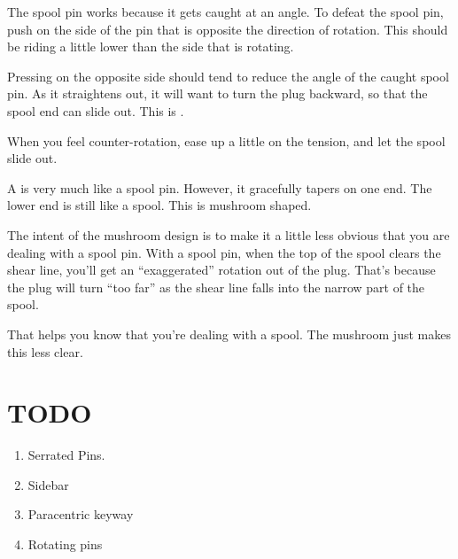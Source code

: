 \documentclass[11pt, oneside]{amsart}
\begin{document}
\begin{proposition}
  The spool pin works because it gets caught at an angle. To defeat the
  spool pin, push on the side of the pin that is opposite the direction
  of rotation. This should be riding a little lower than the side that
  is rotating.

  Pressing on the opposite side should tend to reduce the angle of the
  caught spool pin. As it straightens out, it will want to turn the plug
  backward, so that the spool end can slide out. This is
  .
\end{proposition}

\begin{proposition}
  When you feel counter-rotation, ease up a little on the tension, and
  let the spool slide out.
\end{proposition}

\begin{definition}
  A  is very much like a spool pin. However, it
  gracefully tapers on one end. The lower end is still like a spool.
  This is mushroom shaped.
\end{definition}

\begin{proposition}
  The intent of the mushroom design is to make it a little less obvious
  that you are dealing with a spool pin. With a spool pin, when the top
  of the spool clears the shear line, you'll get an ``exaggerated''
  rotation out of the plug. That's because the plug will turn ``too
  far'' as the shear line falls into the narrow part of the spool.

  That helps you know that you're dealing with a spool. The mushroom
  just makes this less clear.
\end{proposition}


\section{TODO}

\begin{enumerate}
  \item Serrated Pins.
  \item Sidebar
  \item Paracentric keyway
  \item Rotating pins
\end{enumerate}
\end{document}
